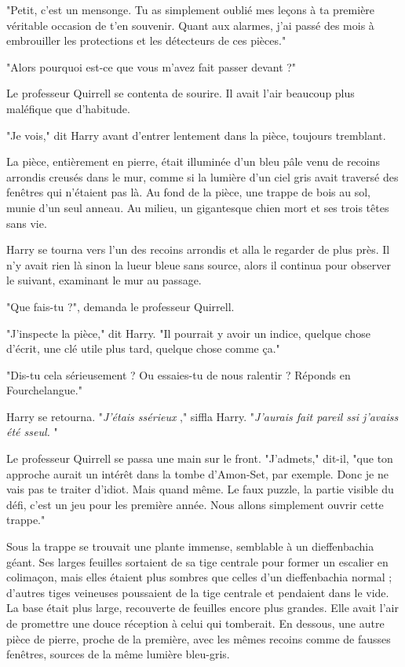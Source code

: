 "Petit, c'est un mensonge. Tu as simplement oublié mes leçons à ta première véritable occasion de t'en souvenir. Quant aux alarmes, j'ai passé des mois à embrouiller les protections et les détecteurs de ces pièces."

"Alors pourquoi est-ce que vous m'avez fait passer devant ?"

Le professeur Quirrell se contenta de sourire. Il avait l'air beaucoup plus maléfique que d'habitude.

"Je vois," dit Harry avant d'entrer lentement dans la pièce, toujours tremblant.

La pièce, entièrement en pierre, était illuminée d'un bleu pâle venu de recoins arrondis creusés dans le mur, comme si la lumière d'un ciel gris avait traversé des fenêtres qui n'étaient pas là. Au fond de la pièce, une trappe de bois au sol, munie d'un seul anneau. Au milieu, un gigantesque chien mort et ses trois têtes sans vie.

Harry se tourna vers l'un des recoins arrondis et alla le regarder de plus près. Il n'y avait rien là sinon la lueur bleue sans source, alors il continua pour observer le suivant, examinant le mur au passage.

"Que fais-tu ?", demanda le professeur Quirrell.

"J'inspecte la pièce," dit Harry. "Il pourrait y avoir un indice, quelque chose d'écrit, une clé utile plus tard, quelque chose comme ça."

"Dis-tu cela sérieusement ? Ou essaies-tu de nous ralentir ? Réponds en Fourchelangue."

Harry se retourna. "\emph{J'étais ssérieux} ," siffla Harry. "\emph{J'aurais fait pareil ssi j'avaiss été sseul.} "

Le professeur Quirrell se passa une main sur le front. "J'admets," dit-il, "que ton approche aurait un intérêt dans la tombe d'Amon-Set, par exemple. Donc je ne vais pas te traiter d'idiot. Mais quand même. Le faux puzzle, la partie visible du défi, c'est un jeu pour les première année. Nous allons simplement ouvrir cette trappe."

Sous la trappe se trouvait une plante immense, semblable à un dieffenbachia géant. Ses larges feuilles sortaient de sa tige centrale pour former un escalier en colimaçon, mais elles étaient plus sombres que celles d'un dieffenbachia normal ; d'autres tiges veineuses poussaient de la tige centrale et pendaient dans le vide. La base était plus large, recouverte de feuilles encore plus grandes. Elle avait l'air de promettre une douce réception à celui qui tomberait. En dessous, une autre pièce de pierre, proche de la première, avec les mêmes recoins comme de fausses fenêtres, sources de la même lumière bleu-gris.

